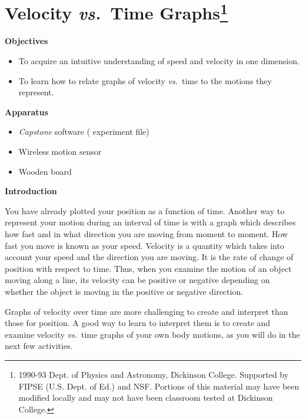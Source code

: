 
\section{Velocity \textit{vs.}~Time Graphs\footnote{
1990-93 Dept. of Physics and Astronomy, Dickinson College. Supported by FIPSE
(U.S. Dept. of Ed.) and NSF. Portions of this material may have been modified
locally and may not have been classroom tested at Dickinson College.
}}

\makelabheader %

\bigskip

\textbf{Objectives }

\begin{itemize}[nosep]
\item To acquire an intuitive understanding of speed and velocity in one dimension. 
\item To learn how to relate graphs of velocity \textit{vs.}~time to the motions they represent.
\end{itemize}

\bigskip
\textbf{Apparatus}

\begin{itemize}[nosep]
\item \textit{Capstone} software ( experiment file)
\item Wireless motion sensor
\item Wooden board
\end{itemize}

\bigskip
\textbf{Introduction} 

You have already plotted your position as a function of time. Another way to
represent your motion during an interval of time is with a graph which describes
how fast and in what direction you are moving from moment to moment. How fast
you move is known as your speed. Velocity is a quantity which takes into account your speed and the direction you are moving. It is the rate of change of position with respect
to time. Thus, when you examine the motion of an object moving
along a line, its velocity can be positive or negative depending
on whether the object is moving in the positive or negative direction.

Graphs of velocity over time are more challenging to create and interpret than
those for position. A good way to learn to interpret them is to create and examine velocity \textit{vs.}~time graphs of your own body motions, as you will do in the next few activities.

